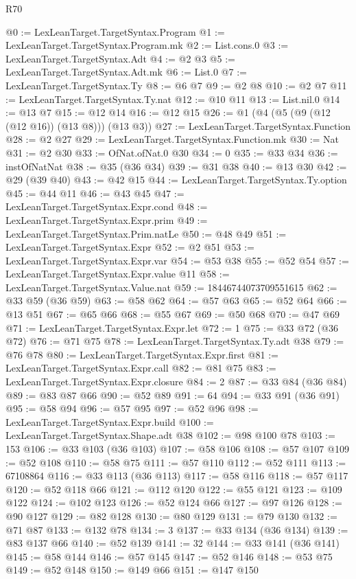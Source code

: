 \begin{lexlean}{R70}
\begin{coremodule}
@0 := LexLeanTarget.TargetSyntax.Program
@1 := LexLeanTarget.TargetSyntax.Program.mk
@2 := List.cons.{0}
@3 := LexLeanTarget.TargetSyntax.Adt
@4 := @2 @3
@5 := LexLeanTarget.TargetSyntax.Adt.mk
@6 := List.{0}
@7 := LexLeanTarget.TargetSyntax.Ty
@8 := @6 @7
@9 := @2 @8
@10 := @2 @7
@11 := LexLeanTarget.TargetSyntax.Ty.nat
@12 := @10 @11
@13 := List.nil.{0}
@14 := @13 @7
@15 := @12 @14
@16 := @12 @15
@26 := @1 (@4 (@5 (@9 (@12 (@12 @16)) (@13 @8))) (@13 @3))
@27 := LexLeanTarget.TargetSyntax.Function
@28 := @2 @27
@29 := LexLeanTarget.TargetSyntax.Function.mk
@30 := Nat
@31 := @2 @30
@33 := OfNat.ofNat.{0} @30
@34 := 0
@35 := @33 @34
@36 := instOfNatNat
@38 := @35 (@36 @34)
@39 := @31 @38
@40 := @13 @30
@42 := @29 (@39 @40)
@43 := @42 @15
@44 := LexLeanTarget.TargetSyntax.Ty.option
@45 := @44 @11
@46 := @43 @45
@47 := LexLeanTarget.TargetSyntax.Expr.cond
@48 := LexLeanTarget.TargetSyntax.Expr.prim
@49 := LexLeanTarget.TargetSyntax.Prim.natLe
@50 := @48 @49
@51 := LexLeanTarget.TargetSyntax.Expr
@52 := @2 @51
@53 := LexLeanTarget.TargetSyntax.Expr.var
@54 := @53 @38
@55 := @52 @54
@57 := LexLeanTarget.TargetSyntax.Expr.value @11
@58 := LexLeanTarget.TargetSyntax.Value.nat
@59 := 18446744073709551615
@62 := @33 @59 (@36 @59)
@63 := @58 @62
@64 := @57 @63
@65 := @52 @64
@66 := @13 @51
@67 := @65 @66
@68 := @55 @67
@69 := @50 @68
@70 := @47 @69
@71 := LexLeanTarget.TargetSyntax.Expr.let
@72 := 1
@75 := @33 @72 (@36 @72)
@76 := @71 @75
@78 := LexLeanTarget.TargetSyntax.Ty.adt @38
@79 := @76 @78
@80 := LexLeanTarget.TargetSyntax.Expr.first
@81 := LexLeanTarget.TargetSyntax.Expr.call
@82 := @81 @75
@83 := LexLeanTarget.TargetSyntax.Expr.closure
@84 := 2
@87 := @33 @84 (@36 @84)
@89 := @83 @87 @66
@90 := @52 @89
@91 := 64
@94 := @33 @91 (@36 @91)
@95 := @58 @94
@96 := @57 @95
@97 := @52 @96
@98 := LexLeanTarget.TargetSyntax.Expr.build
@100 := LexLeanTarget.TargetSyntax.Shape.adt @38
@102 := @98 @100 @78
@103 := 153
@106 := @33 @103 (@36 @103)
@107 := @58 @106
@108 := @57 @107
@109 := @52 @108
@110 := @58 @75
@111 := @57 @110
@112 := @52 @111
@113 := 67108864
@116 := @33 @113 (@36 @113)
@117 := @58 @116
@118 := @57 @117
@120 := @52 @118 @66
@121 := @112 @120
@122 := @55 @121
@123 := @109 @122
@124 := @102 @123
@126 := @52 @124 @66
@127 := @97 @126
@128 := @90 @127
@129 := @82 @128
@130 := @80 @129
@131 := @79 @130
@132 := @71 @87
@133 := @132 @78
@134 := 3
@137 := @33 @134 (@36 @134)
@139 := @83 @137 @66
@140 := @52 @139
@141 := 32
@144 := @33 @141 (@36 @141)
@145 := @58 @144
@146 := @57 @145
@147 := @52 @146
@148 := @53 @75
@149 := @52 @148
@150 := @149 @66
@151 := @147 @150

\end{coremodule}
\end{lexlean}
